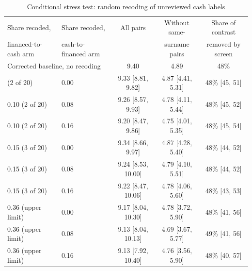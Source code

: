 \begin{table}[htbp]\centering\caption{Conditional stress test: random recoding of unreviewed cash labels}\label{tab:stress}
\footnotesize\setlength{\tabcolsep}{3.5pt}\begin{tabular}{llccc}\toprule
Share recoded, & Share recoded, & All pairs & Without same- & Share of contrast \\
financed-to-cash arm & cash-to-financed arm & & surname pairs & removed by screen \\\midrule
\multicolumn{2}{l}{Corrected baseline, no recoding} & 9.40 & 4.89 & 48\% \\\addlinespace
0.10 (2 of 20) & 0.00 & 9.33 [8.81, 9.82] & 4.87 [4.41, 5.31] & 48\% [45, 51] \\
0.10 (2 of 20) & 0.08 & 9.26 [8.57, 9.93] & 4.78 [4.11, 5.44] & 48\% [45, 52] \\
0.10 (2 of 20) & 0.16 & 9.20 [8.47, 9.86] & 4.75 [4.01, 5.35] & 48\% [45, 54] \\
0.15 (3 of 20) & 0.00 & 9.34 [8.66, 9.97] & 4.87 [4.28, 5.40] & 48\% [44, 52] \\
0.15 (3 of 20) & 0.08 & 9.24 [8.53, 10.00] & 4.79 [4.10, 5.51] & 48\% [44, 52] \\
0.15 (3 of 20) & 0.16 & 9.22 [8.47, 10.06] & 4.78 [4.06, 5.60] & 48\% [43, 53] \\
0.36 (upper limit) & 0.00 & 9.17 [8.04, 10.30] & 4.78 [3.72, 5.90] & 48\% [41, 56] \\
0.36 (upper limit) & 0.08 & 9.13 [8.04, 10.13] & 4.69 [3.67, 5.77] & 49\% [41, 56] \\
0.36 (upper limit) & 0.16 & 9.13 [7.92, 10.40] & 4.76 [3.56, 5.90] & 48\% [40, 57] \\
\bottomrule\end{tabular}
\end{table}
